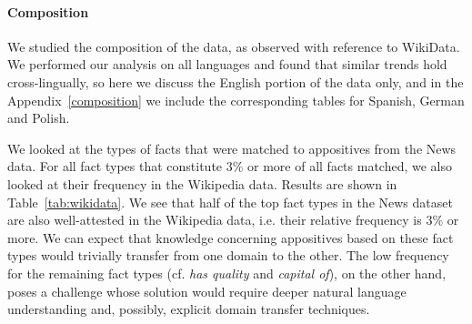\documentclass[11pt]{article}
\newcommand{\jttodo}[1]{\todo[color=blue!20]{#1}}
\begin{document}

\paragraph{Composition} We studied the composition of the data, as observed with reference to WikiData. We performed our analysis on all languages and found that similar trends hold cross-lingually, so here we discuss the English portion of the data only, and in the Appendix~\ref{composition} we include the corresponding tables for Spanish, German and Polish. %


We looked at the types of facts that were matched to appositives from the News data. For all fact types that constitute 3\% or more of all facts matched, we also looked at their frequency in the Wikipedia data. Results are shown in Table~\ref{tab:wikidata}. We see that half of the top fact types in the News dataset are also well-attested in the Wikipedia data, i.e. their relative frequency is 3\% or more. We can expect that knowledge concerning appositives based on these fact types would trivially transfer from one domain to the other. The low frequency for the remaining fact types (cf. \textit{has quality} and \textit{capital of}), on the other hand, poses a challenge whose solution would require deeper natural language understanding and, possibly, explicit domain transfer techniques.   
\end{document}
